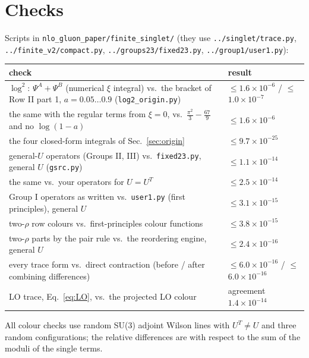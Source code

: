 \documentclass[10pt]{article}
\numberwithin{equation}{section}
\begin{document}
\section{Checks}\label{sec:checks}
Scripts in \texttt{nlo\_gluon\_paper/finite\_singlet/} (they use \texttt{../singlet/trace.py}, \texttt{../finite\_v2/compact.py}, \texttt{../groups23/fixed23.py}, \texttt{../group1/user1.py}):
\begin{table}[H]\centering\small
\begin{tabular}{@{}p{}p{}@{}}\toprule
check & result\\\midrule
$\log^2$: $\Psi^A+\Psi^B$ (numerical $\xi$ integral) vs.\ the bracket of Row II part 1, $a=0.05\dots0.9$ (\texttt{log2\_origin.py}) & $\le$$1.6\times10^{-6}$ / $\le$$1.0\times10^{-7}$\\
the same with the regular terms from $\xi=0$, vs.\ $\frac{\pi^2}{3}-\frac{67}{9}$ and no $\log(1-a)$ & $\le$$1.6\times10^{-6}$\\
the four closed-form integrals of Sec.~\ref{sec:origin} & $\le$$9.7\times10^{-25}$\\
general-$U$ operators (Groups II, III) vs.\ \texttt{fixed23.py}, general $U$ (\texttt{gsrc.py}) & $\le$$1.1\times10^{-14}$\\
the same vs.\ your operators for $U=U^T$ & $\le$$2.5\times10^{-14}$\\
Group I operators as written vs.\ \texttt{user1.py} (first principles), general $U$ & $\le$$3.1\times10^{-15}$\\
two-$\rho$ row colours vs.\ first-principles colour functions & $\le$$3.8\times10^{-15}$\\
two-$\rho$ parts by the pair rule vs.\ the reordering engine, general $U$ & $\le$$2.4\times10^{-16}$\\
every trace form vs.\ direct contraction (before / after combining differences) & $\le$$6.0\times10^{-16}$ / $\le$$6.0\times10^{-16}$\\
LO trace, Eq.~\eqref{eq:LO}, vs.\ the projected LO colour & agreement $1.4\times10^{-14}$\\\bottomrule
\end{tabular}
\end{table}
All colour checks use random SU(3) adjoint Wilson lines with $U^T\ne U$ and three random configurations; the relative differences are with respect to the sum of the moduli of the single terms.
\end{document}
